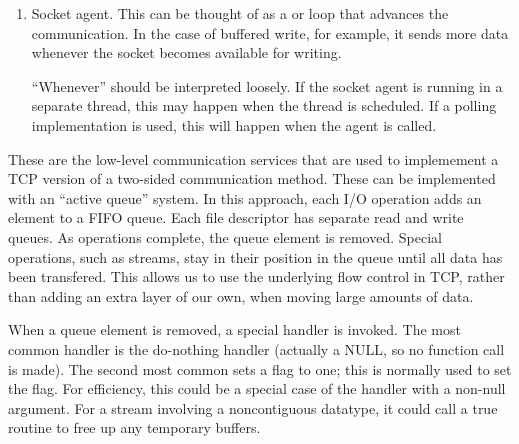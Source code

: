 \begin{enumerate}
\item Socket agent.  This can be thought of as a 
    or  loop that advances the communication.  In the case
    of buffered write, for example, it sends more data whenever the
    socket becomes available for writing.

    ``Whenever'' should be interpreted loosely.  If the socket
    agent is running in a separate thread, this may happen when the
    thread is scheduled.  If a polling implementation is used, this
    will happen when the agent is called.

\end{enumerate}

These are the low-level communication services that are used to
implemement a TCP version of a two-sided communication method.
These can be implemented with an ``active queue'' system.  In this
approach, each I/O operation adds an element to a FIFO queue.  Each
file descriptor has separate read and write queues.  As operations
complete, the queue element is removed.  Special operations, such as
streams, stay in their position in the queue until all data has been
transfered.  This allows us to use the underlying flow control in TCP,
rather than adding an extra layer of our own, when moving large
amounts of data.

When a queue element is removed, a special handler is invoked.  The
most common handler is the do-nothing handler (actually a NULL, so no
function call is made).  The second most common
sets a flag to one; this is normally used to set the
 flag.  For efficiency, this could be a
special case of the  handler with a non-null argument.
For a stream involving a noncontiguous datatype, it could call a true
routine to free up any temporary buffers.

